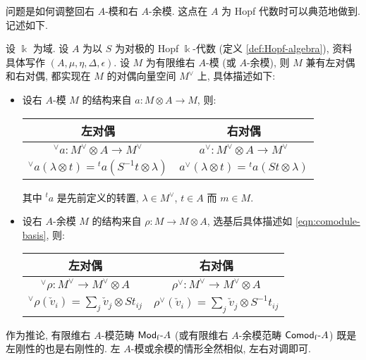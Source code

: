 问题是如何调整回右 $A$-模和右 $A$-余模. 这点在 $A$ 为 Hopf 代数时可以典范地做到. 记述如下.

\begin{proposition}\label{prop:Hopf-module-dual}
	设 $\Bbbk$ 为域. 设 $A$ 为以 $S$ 为对极的 Hopf $\Bbbk$-代数 (定义 \ref{def:Hopf-algebra}), 资料具体写作 $(A, \mu, \eta, \Delta, \epsilon)$. 设 $M$ 为有限维右 $A$-模 (或 $A$-余模), 则 $M$ 兼有左对偶和右对偶, 都实现在 $M$ 的对偶向量空间 $M^\vee$ 上, 具体描述如下:
	\begin{itemize}
		\item 设右 $A$-模 $M$ 的结构来自 $a: M \otimes A \to M$, 则:
		\begin{center}\begin{tabular}{|c|c|} \hline
			左对偶 & 右对偶 \\ \hline
			${}^\vee a: M^\vee \otimes A \to M^\vee$ & $a^\vee: M^\vee \otimes A \to M^\vee$ \\
			${}^\vee a(\lambda \otimes t) = {}^t a\left( S^{-1} t \otimes \lambda\right)$ & $a^\vee(\lambda \otimes t) = {}^t a\left(St \otimes \lambda \right)$
			\\ \hline
		\end{tabular}\end{center}
		其中 ${}^t a$ 是先前定义的转置, $\lambda \in M^\vee$, $t \in A$ 而 $m \in M$.
		\item 设右 $A$-余模 $M$ 的结构来自 $\rho: M \to M \otimes A$, 选基后具体描述如 \eqref{eqn:comodule-basis}, 则:
		\begin{center}\begin{tabular}{|c|c|} \hline
			左对偶 & 右对偶 \\ \hline
			${}^\vee \rho: M^\vee \to M^\vee \otimes A$ & $\rho^\vee: M^\vee \to M^\vee \otimes A$ \\
			${}^\vee \rho (\check{v}_i) = \sum_j \check{v}_j \otimes St_{ij}$ & $\rho^\vee (\check{v}_i) = \sum_j \check{v}_j \otimes S^{-1} t_{ij}$
			\\ \hline
		\end{tabular}\end{center}
	\end{itemize}
	
	作为推论, 有限维右 $A$-模范畴 $\mathsf{Mod}_{\mathrm{f}}\text{-}A$ (或有限维右 $A$-余模范畴 $\mathsf{Comod}_{\mathrm{f}}\text{-}A$) 既是左刚性的也是右刚性的. 左 $A$-模或余模的情形全然相似, 左右对调即可.
\end{proposition}
